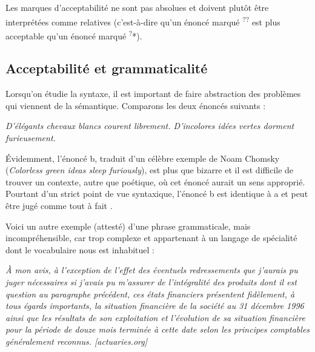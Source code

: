 \ea
{}
\z
\z

Les marques d’acceptabilité ne sont pas absolues et doivent plutôt être interprétées comme relatives (c’est-à-dire qu’un énoncé marqué \textsuperscript{??} est plus acceptable qu’un énoncé marqué \textsuperscript{?}*).

\subsection{Acceptabilité et grammaticalité}

Lorsqu’on étudie la syntaxe, il est important de faire abstraction des problèmes qui viennent de la sémantique. Comparons les deux énoncés suivants :

\ea\label{ex:colorless}
\ea\itshape D’élégants chevaux blancs courent librement.
\ex\itshape D’incolores idées vertes dorment furieusement.
\z
\z

Évidemment, l’énoncé b, traduit d’un célèbre exemple de Noam Chomsky (\textit{Colorless green ideas sleep furiously}), est plus que bizarre et il est difficile de trouver un contexte, autre que poétique, où cet énoncé aurait un sens approprié. Pourtant d’un strict point de vue syntaxique, l’énoncé b est identique à a et peut être jugé comme tout à fait .

Voici un autre exemple (attesté) d’une phrase grammaticale, mais incompréhensible, car trop complexe et appartenant à un langage de spécialité dont le vocabulaire nous est inhabituel :

\ea\itshape
À mon avis, à l’exception de l’effet des éventuels redressements que j’aurais pu juger nécessaires si j’avais pu m’assurer de l’intégralité des produits dont il est question au paragraphe précédent, ces états financiers présentent fidèlement, à tous égards importants, la situation financière de la société au 31 décembre 1996 ainsi que les résultats de son exploitation et l’évolution de sa situation financière pour la période de douze mois terminée à cette date selon les principes comptables généralement reconnus. [actuaries.org]
\z

